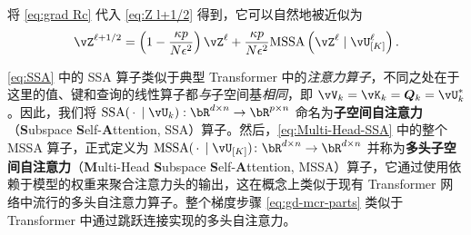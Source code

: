 \documentclass[../../book-main_zh.tex]{subfiles}
\begin{document}
将 \eqref{eq:grad Rc} 代入 \eqref{eq:Z l+1/2} 得到，它可以自然地被近似为
\begin{equation}
    \vZ^{\ell + 1/2} = \left(1 - \frac{\kappa p}{N\epsilon^2}\right) \vZ^{\ell} + \frac{\kappa p}{N\epsilon^2} \mathrm{MSSA}\left({\vZ^{\ell} \mid \vU_{[K]}^{\ell}}\right).  \label{eq:gd-mcr-parts}
\end{equation}



\begin{remark}
    \eqref{eq:SSA} 中的 SSA 算子类似于典型 Transformer \citep{vaswani2017attention} 中的\textit{注意力算子}，不同之处在于这里的值、键和查询的线性算子都\textit{与}子空间基\textit{相同}，即 $\vV_{k} = \vK_{k} = \bm{Q}_{k} = \vU_k^*$。因此，我们将 $\mathrm{SSA}({\spcdot\mid\vU_k}): \bR^{d\times n} \rightarrow \bR^{p\times n}$ 命名为\textbf{子空间自注意力}（\textbf{S}ubspace \textbf{S}elf-\textbf{A}ttention, SSA）算子。然后，\eqref{eq:Multi-Head-SSA} 中的整个 MSSA 算子，正式定义为 \(\mathrm{MSSA}({\spcdot \mid \vU_{[K]}}) \colon \bR^{d \times n} \to \bR^{d \times n}\) 并称为\textbf{多头子空间自注意力}（\textbf{M}ulti-Head \textbf{S}ubspace \textbf{S}elf-\textbf{A}ttention, MSSA）算子，它通过使用依赖于模型的权重来聚合注意力头的输出，这在概念上类似于现有 Transformer 网络中流行的多头自注意力算子。整个梯度步骤 \eqref{eq:gd-mcr-parts} 类似于 Transformer 中通过跳跃连接实现的多头自注意力。
\end{remark}
\end{document}
